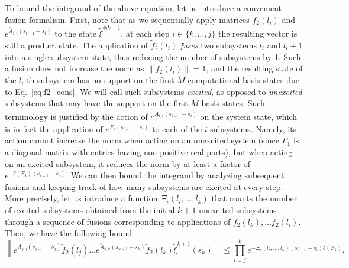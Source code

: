 \documentclass[superscriptaddress,onecolumn,nofootinbib,longbibliography,a4paper,accepted=2026-09-29]{quantumarticle}
\theoremstyle{plain}
\theoremstyle{definition}
\numberwithin{thm}{section}
\numberwithin{assumption}{section}
\numberwithin{lemma}{section}
\numberwithin{prop}{section}
\numberwithin{cor}{section}
\numberwithin{definition}{section}
\numberwithin{rmk}{section}
\numberwithin{equation}{section}
\begin{document}
To bound the integrand of the above equation, let us introduce a convenient fusion formalism. First, note that as we sequentially apply matrices $\tilde{f}_2(l_i)$ and $e^{\tilde{A}_{i,i}(s_{i-1}-s_{i})}$ to the state $\tilde{\xi}^{\otimes k+1}$, at each step $i\in\{k,\dots,j\}$ the resulting vector is still a product state. The application of $\tilde{f}_2(l_i)$ \emph{fuses} two subsystems $l_i$ and $l_i+1$ into a single subsystem state, thus reducing the number of subsystems by 1. Such a fusion does not increase the norm as $\|\tilde{f}_2(l_i)\|=1$, and the resulting state of the $l_i$-th subsystem has no support on the first $M$ computational basis states due to Eq.~\eqref{eq:f2_cons}. We will call such subsystems \emph{excited}, as opposed to \emph{unexcited} subsystems that may have the support on the first $M$ basis states. Such terminology is justified by the action of $e^{\tilde{A}_{i,i}(s_{i-1}-s_{i})}$ on the system state, which is in fact the application of $e^{\tilde{F}_1(s_{i-1}-s_{i})}$ to each of the $i$ subsystems. Namely, its action cannot increase the norm when acting on an unexcited system (since $\tilde{F}_1$ is a diagonal matrix with entries having non-positive real parts), but when acting on an excited subsystem, it reduces the norm by at least a factor of $e^{-\delta(F_1)(s_{i-1}-s_{i})}$. We can then bound the integrand by analyzing subsequent fusions and keeping track of how many subsystems are excited at every step. More precisely, let us introduce a function $\Xi_i(l_i,\dots,l_k)$ that counts the number of excited subsystems obtained from the initial $k+1$ unexcited subsystems through a sequence of fusions corresponding to applications of $\tilde{f}_2(l_k),\dots \tilde{f}_2(l_i)$. Then, we have the following bound
\begin{equation}
    \label{eq:Xi_bound}
    \left\| e^{\tilde{A}_{j,j}(s_{j-1}-s_{j})} \tilde{f}_2(l_j) \dots e^{\tilde{A}_{k,k}(s_{k-1}-s_k)} \tilde{f}_2(l_k) \tilde{\xi}^{k+1}(s_k)\right\| \leq \prod_{i=j}^k e^{-\Xi_i(l_i,\dots,l_k)(s_{i-1}-s_{i})\delta(F_1)}.
\end{equation}
\end{document}
